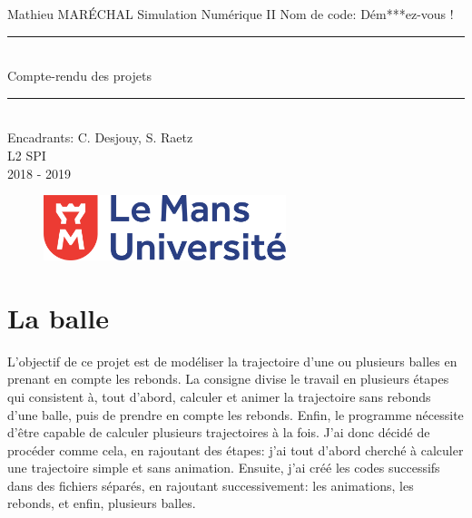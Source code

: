 \documentclass[a4paper, 11pt]{article}
\begin{document}
	\begin{titlepage}
		\begin{center}
			\huge{Mathieu MARÉCHAL}
				\vskip 3cm
			\Huge Simulation Numérique II
				\vskip 0.25cm
			\Large{Nom de code: Dém***ez-vous !}
				\vskip 3.5cm
					\rule{\linewidth}{0.2mm}\vspace{6mm}\\
			\textbf{\Huge{}}
			\Huge{Compte-rendu des projets}
						\rule{\linewidth}{0.2mm}\vspace{3mm}\\
				\vskip 4.5cm
			\LARGE{Encadrants: C. Desjouy, S. Raetz\\L2 SPI\\ 2018 - 2019\\}
				\vskip 2cm
			\begin{figure}[H]
				\centering
  				\includegraphics[width=200pt]{logo_univlemans.png}
  				\setcounter{figure}{0}
  				\setcounter{page}{2}
			\end{figure}
		\end{center}
	\end{titlepage}
	


\newpage
{}
\tableofcontents
\newpage



\section{La balle}

L'objectif de ce projet est de modéliser la trajectoire d'une ou plusieurs balles en prenant en compte les rebonds. La consigne divise le travail en plusieurs étapes qui consistent à, tout d'abord, calculer et animer la trajectoire sans rebonds d'une balle, puis de prendre en compte les rebonds. Enfin, le programme nécessite d'être capable de calculer plusieurs trajectoires à la fois. J'ai donc décidé de procéder comme cela, en rajoutant des étapes: j'ai tout d'abord cherché à calculer une trajectoire simple et sans animation. Ensuite, j'ai créé les codes successifs dans des fichiers séparés, en rajoutant successivement: les animations, les rebonds, et enfin, plusieurs balles.
\end{document}
